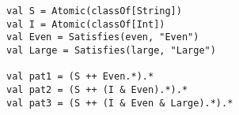 \begin{lstlisting}[style=reclojureScala]
val S = Atomic(classOf[String])
val I = Atomic(classOf[Int])
val Even = Satisfies(even, "Even")
val Large = Satisfies(large, "Large")

val pat1 = (S ++ Even.*).*
val pat2 = (S ++ (I & Even).*).*
val pat3 = (S ++ (I & Even & Large).*).*
\end{lstlisting}
